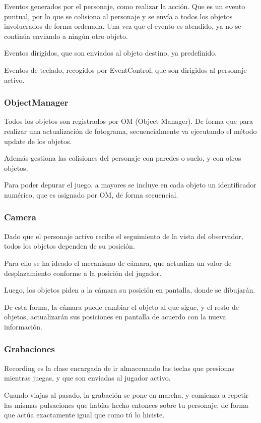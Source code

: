 \documentclass[11pt,a4paper]{article}
\begin{document}
Eventos generados por el personaje, como realizar la acción. Que es un evento 
puntual, por lo que se colisiona al personaje y se envía a todos los objetos 
involucrados de forma ordenada. Una vez que el evento es atendido, ya no se 
continúa enviando a ningún otro objeto.

Eventos dirigidos, que son enviados al objeto destino, ya predefinido.

Eventos de teclado, recogidos por EventControl, que son dirigidos al personaje 
activo.

\subsubsection{ObjectManager}

Todos los objetos son registrados por OM (Object Manager). De forma que para 
realizar una actualización de fotograma, secuencialmente va ejecutando el método 
update de los objetos.

Además gestiona las colisiones del personaje con paredes o suelo, y con otros 
objetos.

Para poder depurar el juego, a mayores se incluye en cada objeto un 
identificador numérico, que es asignado por OM, de forma secuencial.

\subsubsection{Camera}
Dado que el personaje activo recibe el seguimiento de la vista del observador, 
todos los objetos dependen de su posición.

Para ello se ha ideado el mecanismo de cámara, que actualiza un valor de 
desplazamiento conforme a la posición del jugador.

Luego, los objetos piden a la cámara su posición en pantalla, donde se 
dibujarán.

De esta forma, la cámara puede cambiar el objeto al que sigue, y el resto de 
objetos, actualizarán sus posiciones en pantalla de acuerdo con la nueva 
información.

\subsubsection{Grabaciones}

Recording es la clase encargada de ir almacenando las teclas que presionas 
mientras juegas, y que son enviadas al jugador activo.

Cuando viajas al pasado, la grabación se pone en marcha, y comienza a repetir 
las mismas pulsaciones que habías hecho entonces sobre tu personaje, de forma 
que actúa exactamente igual que como tú lo hiciste.
\end{document}
